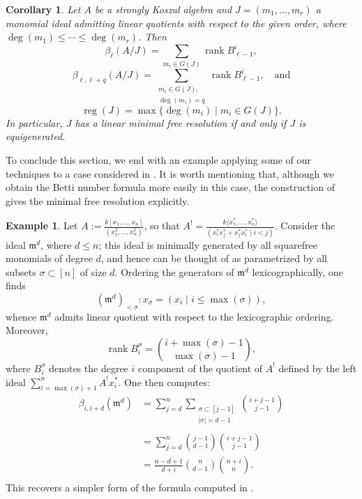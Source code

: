 \documentclass[10pt]{amsart}
\newtheorem{cor}[theorem]{Corollary}
\theoremstyle{definition}
\newtheorem{example}[theorem]{Example}
\theoremstyle{remark}
\newtheorem{the context}[theorem]{The Context}
\numberwithin{equation}{theorem}
\numberwithin{equation}{section}
\newcommand{\rank}{\operatorname{rank}}
\newcommand{\ideal}[1]{\mathfrak{#1}}
\newcommand{\m}{\ideal{m}}
\renewcommand{\leq}{\leqslant}
\begin{document}
\begin{cor}
Let $A$ be a strongly Koszul algebra and $J = (m_1 , \dots , m_r)$ a monomial ideal admitting linear quotients with respect to the given order, where $\deg (m_1) \leq \cdots \leq \deg(m_r)$. Then
$$\beta_\ell (A/J) = \sum_{m_i \in G(J)} \rank B_{\ell-1}^i,$$
$$\beta_{\ell, \ell+q} (A/J) =   \sum_{\substack{m_i \in G(J), \\
\deg (m_i) = q}} \rank B_{\ell-1}^i, \quad \textrm{and}$$
$$\operatorname{reg} (J) = \max \{ \deg (m_i ) \mid m_i \in G(J) \}.$$
In particular, $J$ has a linear minimal free resolution if and only if $J$ is equigenerated.
\end{cor}

To conclude this section, we end with an example applying some of our techniques to a case considered in \cite[Example 6.4]{faber2020canonical}. It is worth mentioning that, although we obtain the Betti number formula more easily in this case, the construction of \cite{faber2020canonical} gives the minimal free resolution explicitly.

\begin{example}
Let $A := \frac{k[x_1 , \dots , x_n]}{(x_1^2 , \dots , x_n^2)}$, so that $A^! = \frac{k\langle x_1^* , \dots  ,x_n^* \rangle}{(x_i^* x_j^* + x_j^* x_i^* \mid i <j )}$. Consider the ideal $\m^d$, where $d \leq n$; this ideal is minimally generated by all squarefree monomials of degree $d$, and hence can be thought of as parametrized by all subsets $\sigma \subset [n]$ of size $d$. Ordering the generators of $\m^d$ lexicographically, one finds
$$(\m^d)_{< \sigma} : x_\sigma = (x_i \mid i \leq \max (\sigma) ),$$
whence $\m^d$ admits linear quotient with respect to the lexicographic ordering. Moreover,
$$\rank B_{i}^\sigma = \binom{i + \max(\sigma) -1}{\max (\sigma) - 1},$$
where $B_i^\sigma$ denotes the degree $i$ component of the quotient of $A^!$ defined by the left ideal $\sum_{i= \max(\sigma) +1}^n A^! x_i^*$. One then computes:
\begingroup\allowdisplaybreaks
\begin{align*}
    \beta_{i,i+d} (\m^d ) &= \sum_{j=d}^n \sum_{\substack{\sigma \subset [j-1] \\
    |\sigma| = d-1 \\}} \binom{i+j-1}{j-1} \\
    &= \sum_{j=d}^n \binom{j-1}{d-1} \binom{i+j-1}{j-1} \\
    &= \frac{n-d+1}{d+i} \binom{n}{d-1} \binom{n+i}{n}. \\
\end{align*}
\endgroup
This recovers a simpler form of the formula computed in \cite{faber2020canonical}.
\end{example}
\end{document}
